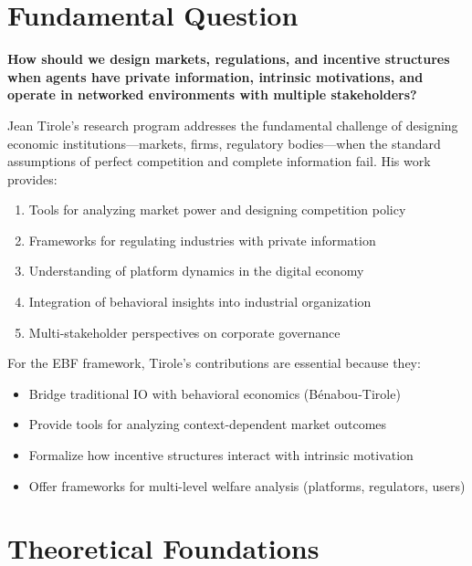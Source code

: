 \section{Fundamental Question}
\label{sec:jt-fundamental}

\begin{tcolorbox}[colback=red!5!white,colframe=red!75!black,title=Fundamental Question]
\textbf{How should we design markets, regulations, and incentive structures when agents have private information, intrinsic motivations, and operate in networked environments with multiple stakeholders?}
\end{tcolorbox}

Jean Tirole's research program addresses the fundamental challenge of designing economic institutions---markets, firms, regulatory bodies---when the standard assumptions of perfect competition and complete information fail. His work provides:

\begin{enumerate}
    \item Tools for analyzing market power and designing competition policy
    \item Frameworks for regulating industries with private information
    \item Understanding of platform dynamics in the digital economy
    \item Integration of behavioral insights into industrial organization
    \item Multi-stakeholder perspectives on corporate governance
\end{enumerate}

For the EBF framework, Tirole's contributions are essential because they:
\begin{itemize}
    \item Bridge traditional IO with behavioral economics (Bénabou-Tirole)
    \item Provide tools for analyzing context-dependent market outcomes
    \item Formalize how incentive structures interact with intrinsic motivation
    \item Offer frameworks for multi-level welfare analysis (platforms, regulators, users)
\end{itemize}

\section{Theoretical Foundations}
\label{sec:jt-theory}

